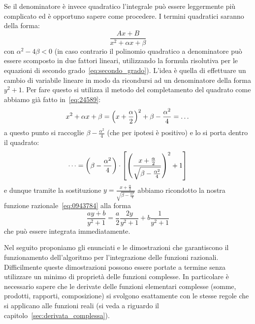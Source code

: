 Se il denominatore è invece quadratico l'integrale può essere leggermente più complicato ed è opportuno sapere come procedere. I termini quadratici
saranno della forma:
\begin{equation}\label{eq:0943784}
\frac{Ax + B}{x^2 + \alpha x + \beta}
\end{equation}
con $\alpha^2-4\beta<0$ (in caso contrario il polinomio quadratico
a denominatore può essere scomposto in due fattori lineari, utilizzando
la formula risolutiva per le equazioni di secondo grado~\eqref{eq:secondo_grado}). L'idea è quella di effettuare un cambio
di variabile lineare in modo da ricondursi ad un denominatore
della forma $y^2+1$. Per fare questo si utilizza il metodo del completamento del quadrato come abbiamo già fatto in~\eqref{eq:24589}:
\[
  x^2 + \alpha x + \beta
  = {\left( x+\frac\alpha 2 \right)}^2  + \beta - \frac{\alpha^2}{4}
  = \dots
\]
a questo punto si raccoglie $\beta-\frac{\alpha^2}{4}$
(che per ipotesi è positivo)
e lo si porta dentro il quadrato:
\[
 \dots = {\left( \beta-\frac{\alpha^2}{4} \right)}\cdot{\left[ {\left( \frac{x+\frac \alpha 2}{\sqrt{\beta -\frac{\alpha^2}{4}}} \right)}^2 + 1 \right]}
\]
e dunque tramite la sostituzione $y=\frac{x + \frac \alpha 2 }{\sqrt{\beta - \frac{\alpha^2}{4}}}$
abbiamo ricondotto la nostra funzione razionale~\eqref{eq:0943784}
alla forma
\[
  \frac{a y + b}{y^2 + 1} = \frac a 2 \frac{2y}{y^2+1} + b\frac{1}{y^2+1}
\]
che può essere integrata immediatamente.

Nel seguito proponiamo gli enunciati e le dimostrazioni che garantiscono
il funzionamento dell'algoritmo per l'integrazione delle funzioni razionali.
Difficilmente queste dimostrazioni possono essere portate a termine
senza utilizzare un minimo di proprietà delle funzioni complesse. In particolare è necessario sapere che le derivate delle funzioni elementari
complesse (somme, prodotti, rapporti, composizione) si svolgono esattamente
con le stesse regole che si applicano alle funzioni reali (si veda a riguardo il capitolo~\ref{sec:derivata_complessa}).

